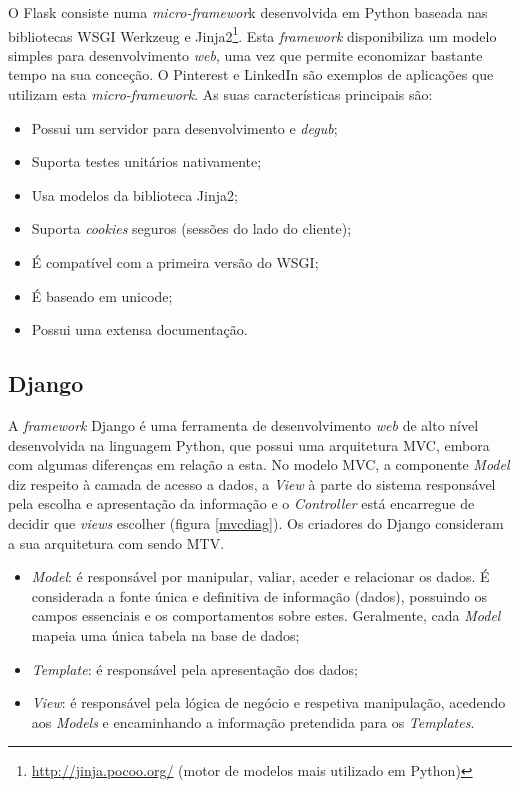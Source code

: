 O Flask consiste numa \textit{micro-framewor}k desenvolvida em Python baseada nas bibliotecas \ac{WSGI} Werkzeug e Jinja2\footnote{\url{http://jinja.pocoo.org/} (motor de modelos mais utilizado em Python)}. Esta \textit{framework} disponibiliza um  modelo simples para desenvolvimento \textit{web}, uma vez que permite economizar bastante tempo na sua conceção. O Pinterest e LinkedIn são exemplos de aplicações que utilizam esta \textit{micro-framework}. As suas características principais são\cite{Flask2014}:  


\begin{itemize}
	\item Possui um servidor para desenvolvimento e \textit{degub}; 
	\item Suporta testes unitários nativamente; 
	\item Usa modelos da biblioteca Jinja2; 
	\item Suporta \textit{cookies} seguros (sessões do lado do cliente); 
	\item É compatível com a primeira versão do \ac{WSGI}; 
	\item É baseado em unicode; 
	\item Possui uma extensa documentação.
\end{itemize}




\subsection{Django}
\label{django}

A \textit{framework} Django é uma ferramenta de desenvolvimento \textit{web} de alto nível desenvolvida na linguagem Python, que possui uma arquitetura \ac{MVC}\cite{Deacon2005}, embora com algumas diferenças em relação a esta. No modelo \ac{MVC}, a componente \textit{Model} diz respeito à camada de acesso a dados, a \textit{View} à parte do sistema responsável pela escolha e apresentação da informação e o \textit{Controller} está encarregue de decidir que \textit{views} escolher (figura \ref{mvcdiag}). Os criadores do Django consideram a sua arquitetura com sendo \ac{MTV}\cite{Index}. 

\begin{itemize}
	\item \textit{Model}: é responsável por manipular, valiar, aceder e relacionar os dados. É considerada a fonte única e definitiva de informação (dados), possuindo os campos essenciais e os comportamentos sobre estes. Geralmente, cada \textit{Model} mapeia uma única tabela na base de dados;
	
	
	\item \textit{Template}: é responsável pela apresentação dos dados; 

	\item \textit{View}: é responsável pela lógica de negócio e respetiva manipulação, acedendo aos \textit{Models} e encaminhando a informação pretendida para os \textit{Templates}. 
	
\end{itemize}

